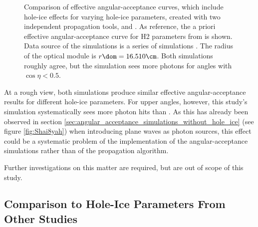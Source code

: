 
\begin{figure}[htbp]
  \hfill
  \hfill
  \hfill
  \hfill
  \caption{Comparison of effective angular-acceptance curves, which include hole-ice effects for varying hole-ice parameters, created with two independent propagation tools, \ppc and \clsim. As reference, the a priori effective angular-acceptance curve for H2 parameters from \cite{icepaper} is shown. Data source of the \ppc simulations is a series of  simulations \cite{icrc17pocam}. The radius of the optical module is $r\dom = 16.510\cm$. Both simulations roughly agree, but the \clsim simulation sees more photons for angles with $\cos \eta < 0.5$.}
  \label{fig:Ou7fux1o}
\end{figure}

At a rough view, both simulations produce similar effective angular-acceptance results for different hole-ice parameters. For upper angles, however, this study's simulation systematically sees more photon hits than \ppc. As this has already been observed in section \ref{sec:angular_acceptance_simulations_without_hole_ice} (see figure \ref{fig:Shai8yah}) when introducing plane waves as photon sources, this effect could be a systematic problem of the implementation of the angular-acceptance simulations rather than of the propagation algorithm.

Further investigations on this matter are required, but are out of scope of this study.\followup


\subsection{Comparison to Hole-Ice Parameters From Other Studies}
\label{sec:angular_acceptance_comparison}\label{sec:parameter_comparison}

